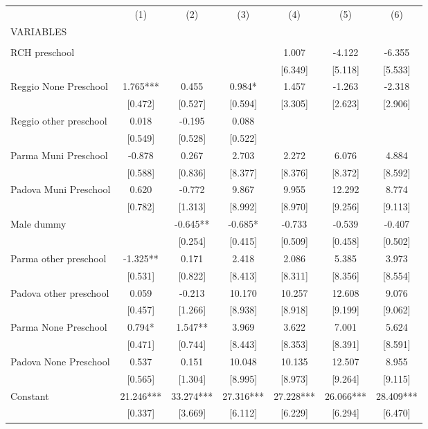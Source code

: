 \begin{tabular}{lcccccc} \hline
 & (1) & (2) & (3) & (4) & (5) & (6) \\
VARIABLES &  &  &  &  &  &  \\ \hline
 &  &  &  &  &  &  \\
RCH preschool &  &  &  & 1.007 & -4.122 & -6.355 \\
 &  &  &  & [6.349] & [5.118] & [5.533] \\
Reggio None Preschool & 1.765*** & 0.455 & 0.984* & 1.457 & -1.263 & -2.318 \\
 & [0.472] & [0.527] & [0.594] & [3.305] & [2.623] & [2.906] \\
Reggio other preschool & 0.018 & -0.195 & 0.088 &  &  &  \\
 & [0.549] & [0.528] & [0.522] &  &  &  \\
Parma Muni Preschool & -0.878 & 0.267 & 2.703 & 2.272 & 6.076 & 4.884 \\
 & [0.588] & [0.836] & [8.377] & [8.376] & [8.372] & [8.592] \\
Padova Muni Preschool & 0.620 & -0.772 & 9.867 & 9.955 & 12.292 & 8.774 \\
 & [0.782] & [1.313] & [8.992] & [8.970] & [9.256] & [9.113] \\
Male dummy &  & -0.645** & -0.685* & -0.733 & -0.539 & -0.407 \\
 &  & [0.254] & [0.415] & [0.509] & [0.458] & [0.502] \\
Parma other preschool & -1.325** & 0.171 & 2.418 & 2.086 & 5.385 & 3.973 \\
 & [0.531] & [0.822] & [8.413] & [8.311] & [8.356] & [8.554] \\
Padova other preschool & 0.059 & -0.213 & 10.170 & 10.257 & 12.608 & 9.076 \\
 & [0.457] & [1.266] & [8.938] & [8.918] & [9.199] & [9.062] \\
Parma None Preschool & 0.794* & 1.547** & 3.969 & 3.622 & 7.001 & 5.624 \\
 & [0.471] & [0.744] & [8.443] & [8.353] & [8.391] & [8.591] \\
Padova None Preschool & 0.537 & 0.151 & 10.048 & 10.135 & 12.507 & 8.955 \\
 & [0.565] & [1.304] & [8.995] & [8.973] & [9.264] & [9.115] \\
Constant & 21.246*** & 33.274*** & 27.316*** & 27.228*** & 26.066*** & 28.409*** \\
 & [0.337] & [3.669] & [6.112] & [6.229] & [6.294] & [6.470] \\

\end{tabular}
